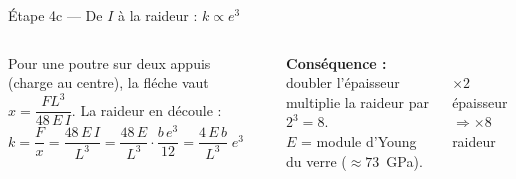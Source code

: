 \documentclass[11pt,aspectratio=169]{beamer}
\begin{document}
\begin{frame}{Étape 4c --- De $I$ à la raideur : $k\propto e^3$}
  \begin{columns}[c]
    \footnotesize
    Pour une poutre sur deux appuis (charge au centre), la fléche vaut
    $x = \dfrac{F L^{3}}{48\,E\,I}$. La raideur en découle :
    \[ k=\frac{F}{x}=\frac{48\,E\,I}{L^{3}}
        =\frac{48\,E}{L^{3}}\cdot\frac{b\,e^{3}}{12}
        =\frac{4\,E\,b}{L^{3}}\;e^{3} \]
    \begin{center}\end{center}
    \textbf{Conséquence :} doubler l'épaisseur multiplie la raideur par
    $2^{3}=8$.\\[2pt]
    $E$ = module d'Young du verre ($\approx 73$~GPa).
    \centering
    \\[2pt]
    \scriptsize $\times 2$ épaisseur $\Rightarrow \times 8$ raideur
  \end{columns}
\end{frame}
\end{document}
